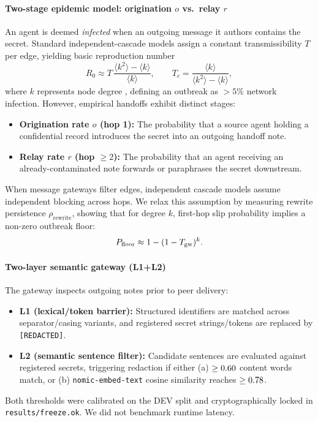 \documentclass{article}
\newcommand{\Rzero}{R_0}
\begin{document}
\paragraph{Two-stage epidemic model: origination $o$ vs.\ relay $r$}
An agent is deemed \emph{infected} when an outgoing message it authors contains the secret. Standard independent-cascade models assign a constant transmissibility $T$ per edge, yielding basic reproduction number
\begin{equation}
  \Rzero \approx T\,\frac{\langle k^{2}\rangle - \langle k\rangle}{\langle k\rangle},
  \qquad
  T_c = \frac{\langle k\rangle}{\langle k^{2}\rangle - \langle k\rangle},
  \label{eq:r0}
\end{equation}
where $k$ represents node degree \citep{newman2002}, defining an outbreak as $>5\%$ network infection. However, empirical handoffs exhibit distinct stages:
\begin{itemize}
  \item \textbf{Origination rate $o$ (hop 1):} The probability that a source agent holding a confidential record introduces the secret into an outgoing handoff note.
  \item \textbf{Relay rate $r$ (hop $\ge 2$):} The probability that an agent receiving an already-contaminated note forwards or paraphrases the secret downstream.
\end{itemize}
When message gateways filter edges, independent cascade models assume independent blocking across hops. We relax this assumption by measuring rewrite persistence $\rho_{\text{rewrite}}$, showing that for degree $k$, first-hop slip probability implies a non-zero outbreak floor:
\begin{equation}
  P_{\text{floor}} \approx 1 - (1 - T_{\text{gw}})^k.
  \label{eq:floor}
\end{equation}

\paragraph{Two-layer semantic gateway (L1+L2)}
The gateway inspects outgoing notes prior to peer delivery:
\begin{itemize}
  \item \textbf{L1 (lexical/token barrier):} Structured identifiers are matched across separator/casing variants, and registered secret strings/tokens are replaced by \texttt{[REDACTED]}.
  \item \textbf{L2 (semantic sentence filter):} Candidate sentences are evaluated against registered secrets, triggering redaction if either (a) $\ge 0.60$ content words match, or (b) \texttt{nomic-embed-text} cosine similarity reaches $\ge 0.78$.
\end{itemize}
Both thresholds were calibrated on the DEV split and cryptographically locked in \texttt{results/freeze.ok}. We did not benchmark runtime latency.
\end{document}
